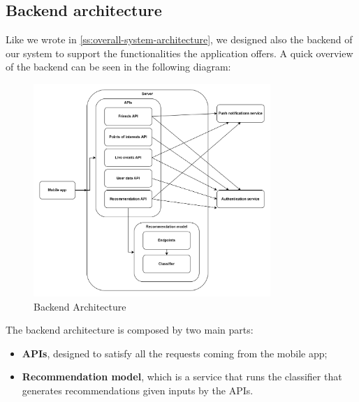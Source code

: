 \documentclass[../../main]{subfiles}
\begin{document}
\subsection{Backend architecture}
\label{ss:backend-architecture}

Like we wrote in \ref{ss:overall-system-architecture}, we designed also the backend of our system to support the functionalities the application offers.
A quick overview of the backend can be seen in the following diagram:
\begin{figure}[h]
    \centering
    \includegraphics[width=0.8\textwidth]{images/backend_architecture}
    \caption{Backend Architecture}\label{img:backend_architecture}
\end{figure}
The backend architecture is composed by two main parts:
\begin{itemize}
    \item \textbf{APIs}, designed to satisfy all the requests coming from the mobile app;
    \item \textbf{Recommendation model}, which is a service that runs the classifier that generates recommendations given inputs by the APIs.
\end{itemize}

\label{sss:apis}
\end{document}

